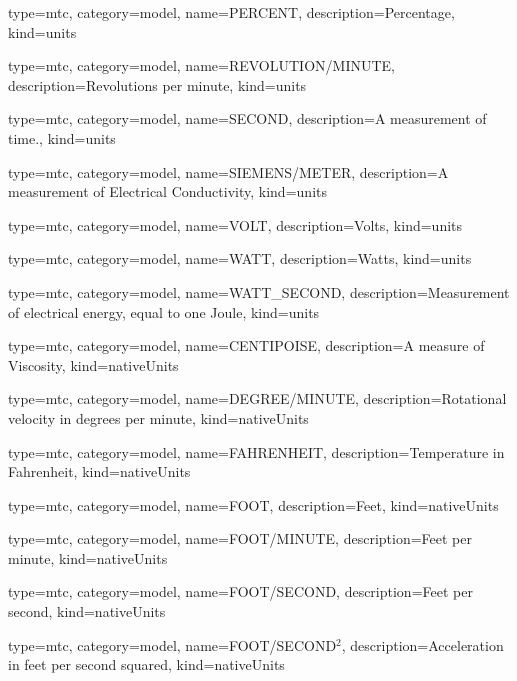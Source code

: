 {
  type=mtc,
  category=model,
  name={PERCENT},
  description={Percentage},
  kind={units}
}


{
  type=mtc,
  category=model,
  name={REVOLUTION/MINUTE},
  description={Revolutions per minute},
  kind={units}
}


{
  type=mtc,
  category=model,
  name={SECOND},
  description={A measurement of time.},
  kind={units}
}


{
  type=mtc,
  category=model,
  name={SIEMENS/METER},
  description={A measurement of Electrical Conductivity},
  kind={units}
}


{
  type=mtc,
  category=model,
  name={VOLT},
  description={Volts},
  kind={units}
}



{
  type=mtc,
  category=model,
  name={WATT},
  description={Watts},
  kind={units}
}


{
  type=mtc,
  category=model,
  name={WATT\_SECOND},
  description={Measurement of electrical energy, equal to one Joule},
  kind={units}
}


{
  type=mtc,
  category=model,
  name={CENTIPOISE},
  description={A measure of Viscosity},
  kind={nativeUnits}
}


{
  type=mtc,
  category=model,
  name={DEGREE/MINUTE},
  description={Rotational velocity in degrees per minute},
  kind={nativeUnits}
}


{
  type=mtc,
  category=model,
  name={FAHRENHEIT},
  description={Temperature in Fahrenheit},
  kind={nativeUnits}
}


{
  type=mtc,
  category=model,
  name={FOOT},
  description={Feet},
  kind={nativeUnits}
}


{
  type=mtc,
  category=model,
  name={FOOT/MINUTE},
  description={Feet per minute},
  kind={nativeUnits}
}


{
  type=mtc,
  category=model,
  name={FOOT/SECOND},
  description={Feet per second},
  kind={nativeUnits}
}


{
  type=mtc,
  category=model,
  name={FOOT/SECOND$^2$},
  description={Acceleration in feet per second squared},
  kind={nativeUnits}
}


